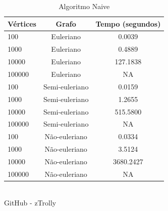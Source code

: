 \begin{table}[htb]
	\centering
	\caption{\hspace{0.1cm} Algoritmo Naive}
	\vspace{-0.3cm} %
	\label{tab:tabela1}
	\begin{tabular}{l|c|c}
  \hline
    \textbf{Vértices}	& \textbf{Grafo} & \textbf{Tempo (segundos)} \\
    \hline
     100	 & Euleriano      &  0.0039     \\
     1000	 & Euleriano      &  0.4889     \\
     10000	 & Euleriano      &  127.1838   \\
     100000  & Euleriano      &  NA         \\
     100	 & Semi-euleriano &  0.0159     \\
     1000	 & Semi-euleriano &  1.2655     \\
     10000	 & Semi-euleriano &  515.5800   \\
     100000  & Semi-euleriano &  NA         \\
     100	 & Não-euleriano  &  0.0334     \\
     1000	 & Não-euleriano  &  3.5124     \\
     10000	 & Não-euleriano  &  3680.2427  \\
     100000  & Não-euleriano  &  NA         \\

     \hline
 \end{tabular}
 	\vspace{.1cm}  %
	\small
	{\footnotesize\\ GitHub - zTrolly}
\end{table}

